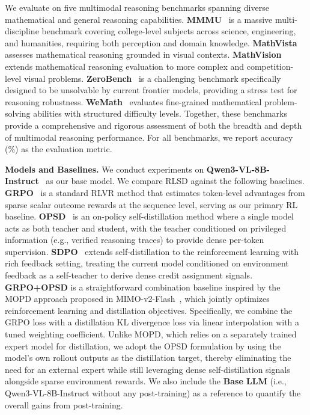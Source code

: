 \documentclass[]{jingdong}
\begin{document}
We evaluate on five multimodal reasoning benchmarks spanning diverse mathematical and general reasoning capabilities. \textbf{MMMU}~\citep{mmmu} is a massive multi-discipline benchmark covering college-level subjects across science, engineering, and humanities, requiring both perception and domain knowledge. \textbf{MathVista}~\citep{mathvista} assesses mathematical reasoning grounded in visual contexts. \textbf{MathVision}~\citep{mathvision} extends mathematical reasoning evaluation to more complex and competition-level visual problems. \textbf{ZeroBench}~\citep{zerobench} is a challenging benchmark specifically designed to be unsolvable by current frontier models, providing a stress test for reasoning robustness. \textbf{WeMath}~\citep{wemath} evaluates fine-grained mathematical problem-solving abilities with structured difficulty levels. Together, these benchmarks provide a comprehensive and rigorous assessment of both the breadth and depth of multimodal reasoning performance. For all benchmarks, we report accuracy (\%) as the evaluation metric.

\noindent \textbf{Models and Baselines.}
We conduct experiments on \textbf{Qwen3-VL-8B-Instruct}~\citep{qwen3vl} as our base model. We compare RLSD against the following baselines. \textbf{GRPO}~\citep{grpo} is a standard RLVR method that estimates token-level advantages from sparse scalar outcome rewards at the sequence level, serving as our primary RL baseline. \textbf{OPSD}~\citep{zhao2026opsd} is an on-policy self-distillation method where a single model acts as both teacher and student, with the teacher conditioned on privileged information (e.g., verified reasoning traces) to provide dense per-token supervision. \textbf{SDPO}~\citep{hbotter2026reinforcementlearningselfdistillation_sdpo} extends self-distillation to the reinforcement learning with rich feedback setting, treating the current model conditioned on environment feedback as a self-teacher to derive dense credit assignment signals. \textbf{GRPO+OPSD} is a straightforward combination baseline inspired by the MOPD approach proposed in MIMO-v2-Flash~\citep{mimo2025flash}, which jointly optimizes reinforcement learning and distillation objectives. Specifically, we combine the GRPO loss with a distillation KL divergence loss via linear interpolation with a tuned weighting coefficient. Unlike MOPD, which relies on a separately trained expert model for distillation, we adopt the OPSD formulation by using the model's own rollout outputs as the distillation target, thereby eliminating the need for an external expert while still leveraging dense self-distillation signals alongside sparse environment rewards. We also include the \textbf{Base LLM} (i.e., Qwen3-VL-8B-Instruct without any post-training) as a reference to quantify the overall gains from post-training.
\end{document}
